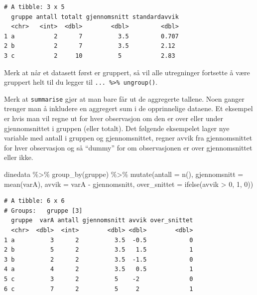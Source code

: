 \documentclass[
  letterpaper,
  DIV=11,
  numbers=noendperiod]{scrreprt}
\newenvironment{Shaded}{\begin{snugshade}}{\end{snugshade}}
\newcommand{\AttributeTok}[1]{\textcolor[rgb]{0.40,0.45,0.13}{#1}}
\newcommand{\DecValTok}[1]{\textcolor[rgb]{0.68,0.00,0.00}{#1}}
\newcommand{\FunctionTok}[1]{\textcolor[rgb]{0.28,0.35,0.67}{#1}}
\newcommand{\NormalTok}[1]{\textcolor[rgb]{0.00,0.23,0.31}{#1}}
\newcommand{\SpecialCharTok}[1]{\textcolor[rgb]{0.37,0.37,0.37}{#1}}
\theoremstyle{definition}
\theoremstyle{remark}
\begin{document}
\begin{verbatim}
# A tibble: 3 x 5
  gruppe antall totalt gjennomsnitt standardavvik
  <chr>   <int>  <dbl>        <dbl>         <dbl>
1 a           2      7          3.5         0.707
2 b           2      7          3.5         2.12 
3 c           2     10          5           2.83 
\end{verbatim}

Merk at når et datasett først er gruppert, så vil alle utregninger
fortsette å være gruppert helt til du legger til
\texttt{...\ \%\textgreater{}\%\ ungroup()}.

Merk at \texttt{summarise} gjør at man bare får ut de aggregerte
tallene. Noen ganger trenger man å inkludere en aggregert sum i de
opprinnelige dataene. Et eksempel er hvis man vil regne ut for hver
observasjon om den er over eller under gjennomsnittet i gruppen (eller
totalt). Det følgende eksempelet lager nye variable med antall i gruppen
og gjennomsnittet, regner avvik fra gjennomsnittet for hver observasjon
og så ``dummy'' for om observasjonen er over gjennomsnittet eller ikke.

\begin{Shaded}
\begin{Highlighting}[]
\NormalTok{dinedata }\SpecialCharTok{\%\textgreater{}\%} 
  \FunctionTok{group\_by}\NormalTok{(gruppe) }\SpecialCharTok{\%\textgreater{}\%} 
  \FunctionTok{mutate}\NormalTok{(}\AttributeTok{antall =} \FunctionTok{n}\NormalTok{(), }\AttributeTok{gjennomsnitt =} \FunctionTok{mean}\NormalTok{(varA), }
         \AttributeTok{avvik =}\NormalTok{ varA }\SpecialCharTok{{-}}\NormalTok{ gjennomsnitt, }
         \AttributeTok{over\_snittet =} \FunctionTok{ifelse}\NormalTok{(avvik }\SpecialCharTok{\textgreater{}} \DecValTok{0}\NormalTok{, }\DecValTok{1}\NormalTok{, }\DecValTok{0}\NormalTok{)) }
\end{Highlighting}
\end{Shaded}

\begin{verbatim}
# A tibble: 6 x 6
# Groups:   gruppe [3]
  gruppe  varA antall gjennomsnitt avvik over_snittet
  <chr>  <dbl>  <int>        <dbl> <dbl>        <dbl>
1 a          3      2          3.5  -0.5            0
2 b          5      2          3.5   1.5            1
3 b          2      2          3.5  -1.5            0
4 a          4      2          3.5   0.5            1
5 c          3      2          5    -2              0
6 c          7      2          5     2              1
\end{verbatim}
\end{document}
